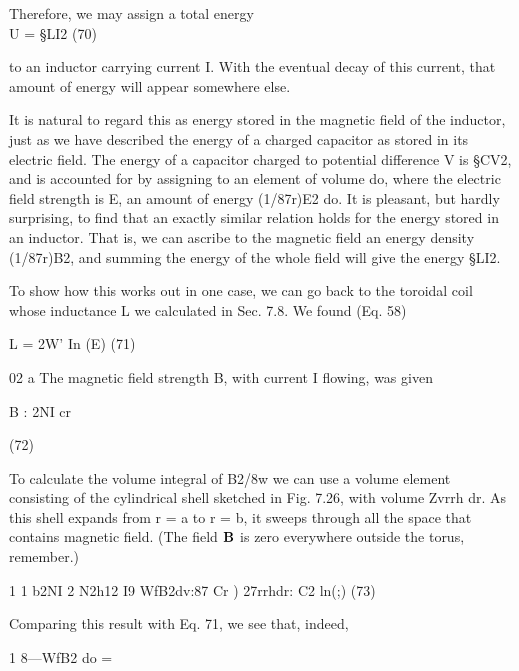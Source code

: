 Therefore, we may assign a total energy
\begin{equation}
\end{equation}
U = §LI2 (70)

to an inductor carrying current I. With the eventual decay of this
current, that amount of energy will appear somewhere else.

It is natural to regard this as energy stored in the magnetic field
of the inductor, just as we have described the energy of a charged
capacitor as stored in its electric field. The energy of a capacitor
charged to potential difference V is §CV2, and is accounted for by
assigning to an element of volume do, where the electric field strength
is E, an amount of energy (1/87r)E2 do. It is pleasant, but hardly
surprising, to find that an exactly similar relation holds for the energy
stored in an inductor. That is, we can ascribe to the magnetic field
an energy density (1/87r)B2, and summing the energy of the whole
field will give the energy §LI2.

To show how this works out in one case, we can go back to the
toroidal coil whose inductance L we calculated in Sec. 7.8. We
found (Eq. 58)

\begin{equation}
\end{equation}
L = 2W' In (E) (71)

02 a
The magnetic field strength B, with current I flowing, was given

\begin{equation}
\end{equation}
B : 2NI
cr

(72)

To calculate the volume integral of B2/8w we can use a volume element
consisting of the cylindrical shell sketched in Fig. 7.26, with
volume Zvrrh dr. As this shell expands from r = a to r = b, it sweeps
through all the space that contains magnetic field. (The field $\mathbf{B}$ is
zero everywhere outside the torus, remember.)

\begin{equation}
\end{equation}
1 1 b2NI 2 N2h12 I9
WfB2dv:87  Cr ) 27rrhdr: C2 ln(;) (73)

Comparing this result with Eq. 71, we see that, indeed,

\begin{equation}
\end{equation}
1
8---WfB2 do = %

